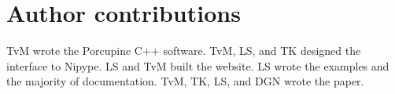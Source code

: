 \section{Author contributions}
TvM wrote the Porcupine C++ software. TvM, LS, and TK designed the interface to Nipype. LS and TvM built the website. LS wrote the examples and the majority of documentation. TvM, TK, LS, and DGN wrote the paper.